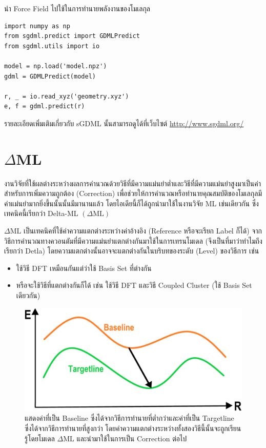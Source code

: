 นำ Force Field ไปใช้ในการทำนายพลังงานของโมเลกุล

\begin{lstlisting}[style=MyPython]
import numpy as np
from sgdml.predict import GDMLPredict
from sgdml.utils import io

model = np.load('model.npz')
gdml = GDMLPredict(model)

r, _ = io.read_xyz('geometry.xyz')
e, f = gdml.predict(r)
\end{lstlisting}

\vspace{1em}

รายละเอียดเพิ่มเติมเกี่ยวกับ sGDML นั้นสามารถดูได้ที่เว็บไซต์ \url{http://www.sgdml.org/}

\section{\texorpdfstring{$\Delta$}-ML}
\label{sec:delta_ML}

งานวิจัยที่ใช้ผลต่างระหว่างผลการคำนวณด้วยวิธีที่มีความแม่นยำต่ำและวิธีที่มีความแม่นยำสูงมาเป็นค่าสำหรับการเพิ่มความถูกต้อง (Correction) เพื่อช่วยให้การคำนวณหรือทำนายคุณสมบัติของโมเลกุลมีค่าแม่นยำมากยิ่งขึ้นนั้นนั้นมีมานานแล้ว\autocite{hu2003,wu2007,balabin2009} โดยไอเดียนี้ก็ได้ถูกนำมาใช้ในงานวิจัย ML เช่นเดียวกัน ซึ่งเทคนิคนี้เรียกว่า Delta-ML $(\Delta\text{ML})$

$\Delta\text{ML}$ เป็นเทคนิคที่ใช้ค่าความแตกต่างระหว่างค่าอ้างอิง (Reference หรือจะเรียก Label ก็ได้) จากวิธีการคำนวณทางควอนตัมที่มีความแม่นยำแตกต่างกันมาใช้ในการเทรนโมเดล (จึงเป็นที่มาว่าทำไมถึงเรียกว่า Detla) โดยความแตกต่างนั้นอาจจะแตกต่างกันในบริบทของระดับ (Level) ของวิธีการ เช่น
%
\begin{itemize}[topsep=0pt,noitemsep]\setlength\itemsep{0.5em}
    \item ใช้วิธี DFT เหมือนกันแต่ว่าใช้ Basis Set ที่ต่างกัน

    \item  หรือจะใช้วิธีที่แตกต่างกันก็ได้ เช่น ใช้วิธี DFT และวิธี Coupled Cluster (ใช้ Basis Set เดียวกัน)
\end{itemize}

\begin{figure}[H]
    \centering
    \includegraphics[width=0.7\linewidth]{fig/delta_ml_base_target.jpg}
    \caption{แสดงค่าที่เป็น Baseline ซึ่งได้จากวิธีการทำนายที่ต่ำกว่าและค่าที่เป็น Targetline ซึ่งได้จากวิธีการทำนายที่สูงกว่า โดยค่าความแตกต่างระหว่างทั้งสองวิธีนี้นั้นจะถูกเรียนรู้โดยโมเดล $\Delta\text{ML}$ และนำมาใช้ในการเป็น Correction ต่อไป}
    \label{fig:delta_ml}
\end{figure}

